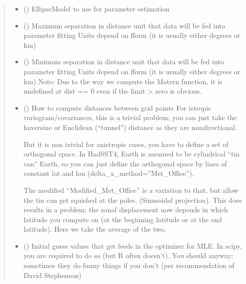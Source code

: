 \documentclass[letterpaper,10pt,english]{sphinxmanual}
\begin{document}
\begin{fulllineitems}
\begin{fulllineitems}
\begin{quote}
\begin{description}
\begin{itemize}
\item {}
\sphinxAtStartPar
{} ({\hyperref[\detokenize{ellipse:glomar_gridding.ellipse.EllipseModel}]{}}) \textendash{} EllipseModel to use for parameter estimation

\item {}
\sphinxAtStartPar
{} () \textendash{} Maximum separation in distance unit that data will be fed
into parameter fitting
Units depend on fform (it is usually either degrees or km)

\item {}
\sphinxAtStartPar
{} () \textendash{} Minimum separation in distance unit that data
will be fed into parameter fitting
Units depend on fform (it is usually either degrees or km)
Note: Due to the way we compute the Matern function,
it is undefined at dist == 0 even if the limit \sphinxhyphen{}\textgreater{} zero is obvious.

\item {}
\sphinxAtStartPar
{} () \textendash{}
\sphinxAtStartPar
How to compute distances between grid points
For istropic variogram/covariances, this is a trivial problem;
you can just take the haversine or
Euclidean (“tunnel”) distance as they are non\sphinxhyphen{}directional.

\sphinxAtStartPar
But it is non trivial for anistropic cases,
you have to define a set of orthogonal space. In HadSST4,
Earth is assumed to be cylindrical “tin can” Earth,
so you can just define the orthogonal space by
lines of constant lat and lon (delta\_x\_method=”Met\_Office”).

\sphinxAtStartPar
The modified “Modified\_Met\_Office” is a variation to that,
but allow the tin can get squished at the poles.
(Sinusoidal projection). This does results in a problem:
the zonal displacement now depends in which latitude
you compute on (at the beginning latitude or at the end latitude).
Here we take the average of the two.


\item {}
\sphinxAtStartPar
{} () \textendash{} Initial guess values that get feeds in the optimizer for MLE.
In scipy, you are required to do so (but R often doesn’t).
You should anyway; sometimes they do funny things
if you don’t (per recommendation of David Stephenson)


\end{itemize}
\end{description}
\end{quote}
\end{fulllineitems}
\end{fulllineitems}
\end{document}
